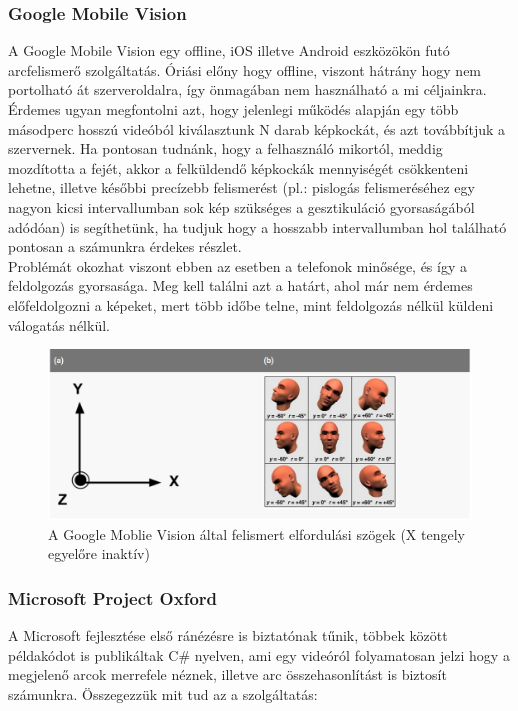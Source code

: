 \subsubsection{Google Mobile Vision}
A Google Mobile Vision\cite{GMV} egy offline, iOS illetve Android eszközökön futó arcfelismerő szolgáltatás. Óriási előny hogy offline, viszont hátrány hogy nem portolható át szerveroldalra, így önmagában nem használható a mi céljainkra. Érdemes ugyan megfontolni azt, hogy jelenlegi működés alapján egy több másodperc hosszú videóból kiválasztunk N darab képkockát, és azt továbbítjuk a szervernek. Ha pontosan tudnánk, hogy a felhasználó mikortól, meddig mozdította a fejét, akkor a felküldendő képkockák mennyiségét csökkenteni lehetne, illetve későbbi precízebb felismerést (pl.: pislogás felismeréséhez egy nagyon kicsi intervallumban sok kép szükséges a gesztikuláció gyorsaságából adódóan) is segíthetünk, ha tudjuk hogy a hosszabb intervallumban hol található pontosan a számunkra érdekes részlet.
\\Problémát okozhat viszont ebben az esetben a telefonok minősége, és így a feldolgozás gyorsasága. Meg kell találni azt a határt, ahol már nem érdemes előfeldolgozni a képeket, mert több időbe telne, mint feldolgozás nélkül küldeni válogatás nélkül.
\begin{figure}[h]
\centering
  \includegraphics[scale=0.5]{img/gmv}
    \caption{A Google Moblie Vision által felismert elfordulási szögek (X tengely egyelőre inaktív)  \cite{GMV_ANGLES}}
\end{figure}

\subsubsection{Microsoft Project Oxford}
A Microsoft fejlesztése első ránézésre is biztatónak tűnik, többek között példakódot is publikáltak C\# nyelven, ami egy videóról folyamatosan jelzi hogy a megjelenő arcok merrefele néznek, illetve arc összehasonlítást is biztosít számunkra. Összegezzük mit tud az a szolgáltatás:


